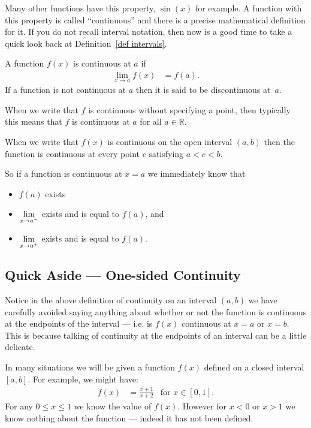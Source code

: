 Many other functions have this property, $\sin(x)$ for example. A function
with this property is called ``continuous'' and there is a precise mathematical definition
for it. If you do not recall interval notation, then now is a good time to take a quick
look back at Definition~\ref{def intervals}.
\begin{defn}\label{def_1_6_1}
A function $f(x)$ is continuous at $a$ if
\begin{align*}
	\lim_{x \to a} f(x) &= f(a).
\end{align*}
If a function is not continuous at $a$ then it is said to be discontinuous
at~$a$.

When we write that $f$ is continuous without specifying a point, then typically
this means that $f$ is continuous at $a$ for all $a \in \mathbb{R}$.

When we write that $f(x)$ is continuous on the open interval $(a,b)$ then the function is
continuous at every point $c$ satisfying $a<c<b$.
\end{defn}

So if a function is continuous at $x=a$ we immediately know that
\begin{itemize}
 \item $f(a)$ exists
 \item $\displaystyle \lim_{x \to a^-}$ exists and is equal to $f(a)$, and
 \item $\displaystyle \lim_{x \to a^+}$ exists and is equal to $f(a)$.
\end{itemize}

\subsection*{Quick Aside --- One-sided Continuity}
Notice in the above definition of continuity on an interval $(a,b)$ we have carefully
avoided saying anything about whether or not the function is continuous at the endpoints
of the interval --- i.e. is $f(x)$ continuous at $x=a$ or $x=b$. This is because talking
of
continuity at the endpoints of an interval can be a little delicate.

In many situations we will be given a function $f(x)$ defined on a closed interval
$[a,b]$. For example, we might have:
\begin{align*}
  f(x) &= \frac{x+1}{x+2} & \text{for $x \in [0,1]$}.
\end{align*}
For any $0 \leq x \leq 1$ we know the value of $f(x)$. However for $x<0$ or $x>1$ we
know nothing about the function --- indeed it has not been defined.

